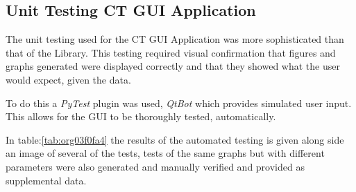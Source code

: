\documentclass[11pt]{report}
\begin{document}
\clearpage

\subsection{Unit Testing CT GUI Application}
\label{sec:org3235037}

The unit testing used for the CT GUI Application was more sophisticated than that of the Library. This testing required visual confirmation that figures and graphs generated were displayed correctly and that they showed what the user would expect, given the data.

To do this a \emph{PyTest} plugin was used, \emph{QtBot} which provides simulated user input. This allows for the GUI to be thoroughly tested, automatically.

In table:\ref{tab:org03f0fa4} the results of the automated testing is given along side an image of several of the tests, tests of the same graphs but with different parameters were also generated and manually verified and provided as supplemental data.
\end{document}
